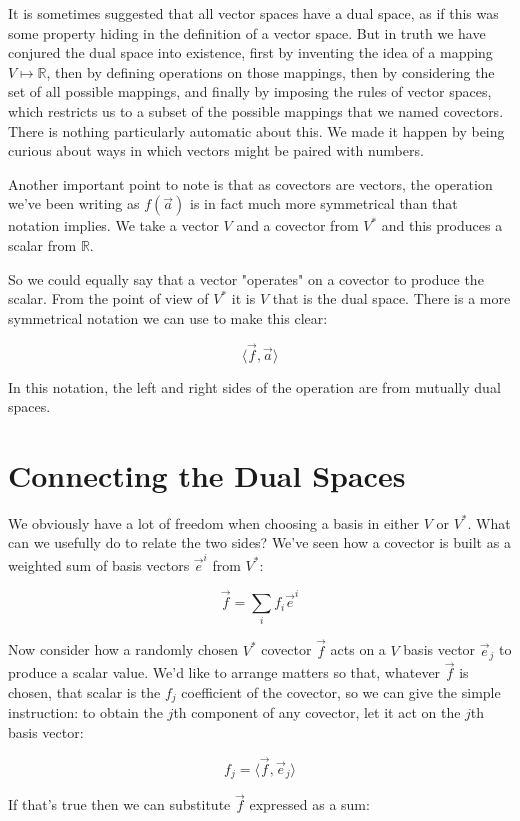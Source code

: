 It is sometimes suggested that all vector spaces have a dual space, as if this was some property hiding in the definition of a vector space. But in truth we have conjured the dual space into existence, first by inventing the idea of a mapping $V \mapsto \mathbb{R}$, then by defining operations on those mappings, then by considering the set of all possible mappings, and finally by imposing the rules of vector spaces, which restricts us to a subset of the possible mappings that we named covectors. There is nothing particularly automatic about this. We made it happen by being curious about ways in which vectors might be paired with numbers.

Another important point to note is that as covectors are vectors, the operation we've been writing as $f(\vec{a})$ is in fact much more symmetrical than that notation implies. We take a vector $V$ and a covector from $V^*$ and this produces a scalar from $\mathbb{R}$. 

So we could equally say that a vector "operates" on a covector to produce the scalar. From the point of view of $V^*$ it is $V$ that is the dual space. There is a more symmetrical notation we can use to make this clear:

$$\langle \vec{f},\vec{a}\rangle$$

In this notation, the left and right sides of the operation are from mutually dual spaces.

\section{Connecting the Dual Spaces}

We obviously have a lot of freedom when choosing a basis in either $V$ or $V^*$. What can we usefully do to relate the two sides? We've seen how a covector is built as a weighted sum of basis vectors $\vec{e}^i$ from $V^*$:

$$
\vec{f} = \sum_i f_i \vec{e}^i
$$

Now consider how a randomly chosen $V^*$ covector $\vec{f}$ acts on a $V$ basis vector $\vec{e}_j$ to produce a scalar value. We'd like to arrange matters so that, whatever $\vec{f}$ is chosen, that scalar is the $f_j$ coefficient of the covector, so we can give the simple instruction: to obtain the $j$th component of any covector, let it act on the $j$th basis vector:

$$
f_j = \langle \vec{f} , \vec{e}_j\rangle
$$

If that's true then we can substitute $\vec{f}$ expressed as a sum:

